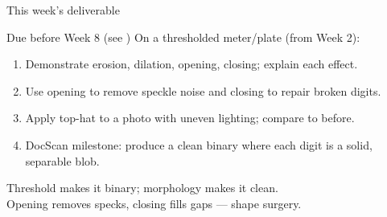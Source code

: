 \documentclass[10pt,aspectratio=169]{beamer}
\begin{document}
\begin{frame}{This week's deliverable}
  \begin{alertblock}{Due before Week 8 (see )}
    On a thresholded meter/plate (from Week 2):
    \begin{enumerate}
      \item Demonstrate erosion, dilation, opening, closing; explain each effect.
      \item Use opening to remove speckle noise and closing to repair broken digits.
      \item Apply top-hat to a photo with uneven lighting; compare to before.
      \item DocScan milestone: produce a clean binary where each digit is a solid, separable blob.
    \end{enumerate}
  \end{alertblock}
\end{frame}

\begin{frame}[standout]
  Threshold makes it binary; morphology makes it clean.\\[4pt]
  \normalsize Opening removes specks, closing fills gaps — shape surgery.
\end{frame}
\end{document}
